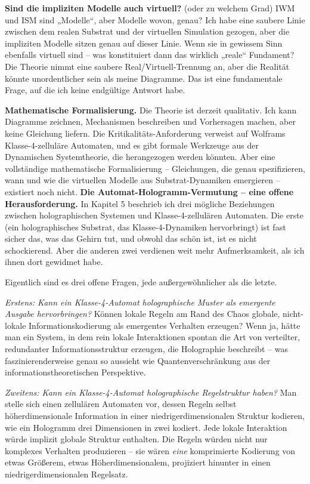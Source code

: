 \documentclass[11pt, twoside, openright]{book}
\begin{document}
\textbf{Sind die impliziten Modelle auch virtuell?} (oder zu welchem Grad) IWM und ISM sind „Modelle“, aber Modelle wovon, genau? Ich habe eine saubere Linie zwischen dem realen Substrat und der virtuellen Simulation gezogen, aber die impliziten Modelle sitzen genau auf dieser Linie. Wenn sie in gewissem Sinn ebenfalls virtuell sind -- was konstituiert dann das wirklich „reale“ Fundament? Die Theorie nimmt eine saubere Real/Virtuell-Trennung an, aber die Realität könnte unordentlicher sein als meine Diagramme. Das ist eine fundamentale Frage, auf die ich keine endgültige Antwort habe.

\textbf{Mathematische Formalisierung.} Die Theorie ist derzeit qualitativ. Ich kann Diagramme zeichnen, Mechanismen beschreiben und Vorhersagen machen, aber keine Gleichung liefern. Die Kritikalitäts-Anforderung verweist auf Wolframs Klasse-4-zelluläre Automaten, und es gibt formale Werkzeuge aus der Dynamischen Systemtheorie, die herangezogen werden könnten. Aber eine vollständige mathematische Formalisierung -- Gleichungen, die genau spezifizieren, wann und wie die virtuellen Modelle aus Substrat-Dynamiken emergieren -- existiert noch nicht.
\textbf{Die Automat-Hologramm-Vermutung -- eine offene Herausforderung.} In Kapitel 5 beschrieb ich drei mögliche Beziehungen zwischen holographischen Systemen und Klasse-4-zellulären Automaten. Die erste (ein holographisches Substrat, das Klasse-4-Dynamiken hervorbringt) ist fast sicher das, was das Gehirn tut, und obwohl das schön ist, ist es nicht schockierend. Aber die anderen zwei verdienen weit mehr Aufmerksamkeit, als ich ihnen dort gewidmet habe.

Eigentlich sind es drei offene Fragen, jede außergewöhnlicher als die letzte.

\textit{Erstens: Kann ein Klasse-4-Automat holographische Muster als emergente Ausgabe hervorbringen?} Können lokale Regeln am Rand des Chaos globale, nicht-lokale Informationskodierung als emergentes Verhalten erzeugen? Wenn ja, hätte man ein System, in dem rein lokale Interaktionen spontan die Art von verteilter, redundanter Informationsstruktur erzeugen, die Holographie beschreibt -- was faszinierenderweise genau so aussieht wie Quantenverschränkung aus der informationstheoretischen Perspektive.

\textit{Zweitens: Kann ein Klasse-4-Automat holographische Regelstruktur haben?} Man stelle sich einen zellulären Automaten vor, dessen Regeln selbst höherdimensionale Information in einer niedrigerdimensionalen Struktur kodieren, wie ein Hologramm drei Dimensionen in zwei kodiert. Jede lokale Interaktion würde implizit globale Struktur enthalten. Die Regeln würden nicht nur komplexes Verhalten produzieren -- sie wären \textit{eine} komprimierte Kodierung von etwas Größerem, etwas Höherdimensionalem, projiziert hinunter in einen niedrigerdimensionalen Regelsatz.
\end{document}
